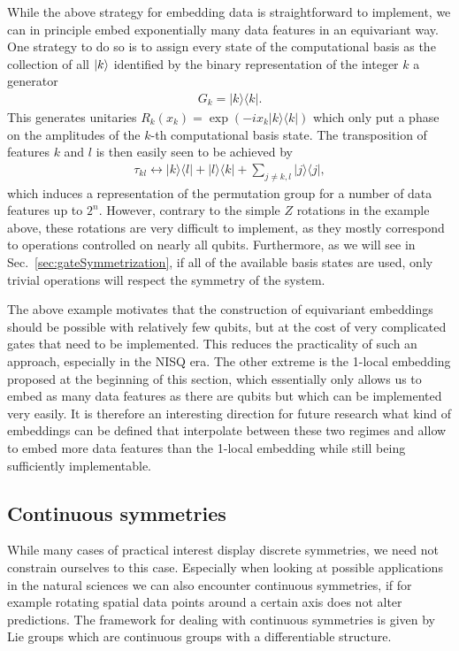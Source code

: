 \documentclass[a4paper,twocolumn,notitlepage,nofootinbib,superscriptaddress,floatfix]{revtex4-2}
\begin{document}
While the above strategy for embedding data is straightforward to implement, we can in principle embed exponentially many data features in an equivariant way. One strategy to do so is to assign every state of the computational basis as the collection of all $\ket{k}$ identified by the binary representation of the integer $k$ a generator
\begin{align}
    G_k = |k \rangle \!\langle k |.
\end{align}
This generates unitaries $R_k(x_k) = \exp(-i x_k |k \rangle \!\langle k |)$ which only put a phase on the amplitudes of the $k$-th computational basis state. The transposition of features $k$ and $l$ is then easily seen to be achieved by
\begin{align}
    \tau_{kl} \leftrightarrow |k \rangle \!\langle l | + |l \rangle \!\langle k | + \sum_{j \neq k,l} |j \rangle\!\langle j |,
\end{align}
which induces a representation of the permutation group for a number of data features up to $2^n$. However, contrary to the simple $Z$ rotations in the example above, these rotations are very difficult to implement, as they mostly correspond to operations controlled on nearly all qubits. Furthermore, as we will see in Sec.~\ref{sec:gateSymmetrization}, if all of the available basis states are used, only trivial operations will respect the symmetry of the system.

The above example motivates that the construction of equivariant embeddings should be possible with relatively few qubits, but at the cost of very complicated gates that need to be implemented. This reduces the practicality of such an approach, especially in the NISQ era. 
The other extreme is the 1-local embedding proposed at the beginning of this section, which essentially only allows us to embed as many data features as there are qubits but which can be implemented very easily. 
It is therefore an interesting direction for future research what kind of embeddings can be defined that interpolate between these two regimes and allow to embed more data features than the 1-local embedding while still being sufficiently implementable.
    

\subsection*{Continuous symmetries}
    
While many cases of practical interest display discrete symmetries, we need not constrain ourselves to this case. Especially when looking at possible applications in the natural sciences we can also encounter continuous symmetries, if for example rotating spatial data points around a certain axis does not alter predictions. The framework for dealing with continuous symmetries is given by Lie groups which are continuous groups with a differentiable structure.  
\end{document}
